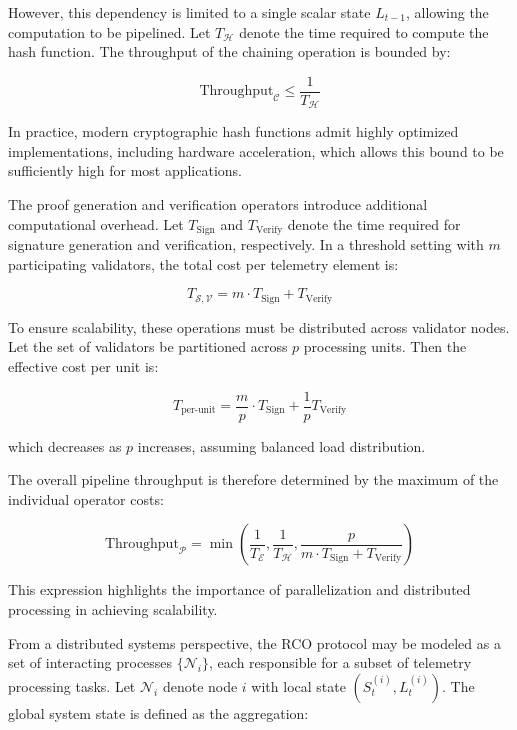 However, this dependency is limited to a single scalar state $L_{t-1}$, allowing the computation to be pipelined. Let $T_{\mathcal{H}}$ denote the time required to compute the hash function. The throughput of the chaining operation is bounded by:

\begin{equation}
\text{Throughput}_{\mathcal{C}} \leq \frac{1}{T_{\mathcal{H}}}
\end{equation}

In practice, modern cryptographic hash functions admit highly optimized implementations, including hardware acceleration, which allows this bound to be sufficiently high for most applications.

The proof generation and verification operators introduce additional computational overhead. Let $T_{\text{Sign}}$ and $T_{\text{Verify}}$ denote the time required for signature generation and verification, respectively. In a threshold setting with $m$ participating validators, the total cost per telemetry element is:

\begin{equation}
T_{\mathcal{S}, \mathcal{V}} = m \cdot T_{\text{Sign}} + T_{\text{Verify}}
\end{equation}

To ensure scalability, these operations must be distributed across validator nodes. Let the set of validators be partitioned across $p$ processing units. Then the effective cost per unit is:

\begin{equation}
T_{\text{per-unit}} = \frac{m}{p} \cdot T_{\text{Sign}} + \frac{1}{p} T_{\text{Verify}}
\end{equation}

which decreases as $p$ increases, assuming balanced load distribution.

The overall pipeline throughput is therefore determined by the maximum of the individual operator costs:

\begin{equation}
\text{Throughput}_{\mathcal{P}} = \min \left( \frac{1}{T_{\mathcal{E}}}, \frac{1}{T_{\mathcal{H}}}, \frac{p}{m \cdot T_{\text{Sign}} + T_{\text{Verify}}} \right)
\end{equation}

This expression highlights the importance of parallelization and distributed processing in achieving scalability.

From a distributed systems perspective, the RCO protocol may be modeled as a set of interacting processes $\{\mathcal{N}_i\}$, each responsible for a subset of telemetry processing tasks. Let $\mathcal{N}_i$ denote node $i$ with local state $(S_t^{(i)}, L_t^{(i)})$. The global system state is defined as the aggregation:

